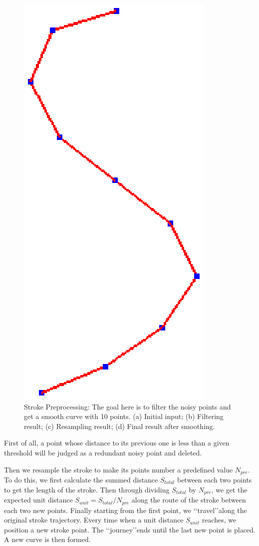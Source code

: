 \begin{figure} [htbp]
{\begin{minipage}[b]{0.2\textwidth}
      \includegraphics[scale=0.3]{figs/f3.strokepre-4.eps}
    \end{minipage}}
  \caption{Stroke Preprocessing: The goal here is to filter the noisy points and get a smooth curve with 10 points. (a) Initial input; (b) Filtering result; (c) Resampling result; (d) Final result after smoothing.}
  \label{fig:alstrokeproc} %
\end{figure}

First of all, a point whose distance to its previous one is less
than a given threshold will be judged as a redundant noisy point and
deleted.

Then we resample the stroke to make its points number a  predefined
value $N_{pre}$. To do this, we first calculate the summed distance
$S_{total}$ between each two points to get the length of the stroke.
Then through dividing $S_{total}$ by $N_{pre}$, we get the expected
unit distance $S_{unit}=S_{total} / N_{pre}$ along the route of the
stroke between each two new points. Finally starting from the first
point, we \lq\lq{travel}\rq\rq along the original stroke trajectory.
Every time when a unit distance $S_{unit}$ reaches, we position a
new stroke point. The \lq\lq{journey}\rq\rq ends until the last new
point is placed. A new curve is then formed.

